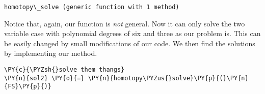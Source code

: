 \documentclass[11pt]{article}
\begin{document}
            \begin{tcolorbox}[breakable, size=fbox, boxrule=.5pt, pad at break*=1mm, opacityfill=0]
\begin{Verbatim}[commandchars=\\\{\}]
homotopy\_solve (generic function with 1 method)
\end{Verbatim}
\end{tcolorbox}
        
    Notice that, again, our function is \emph{not} general. Now it can only
solve the two variable case with polynomial degrees of six and three as
our problem is. This can be easily changed by small modifications of our
code. We then find the solutions by implementing our method.

    \begin{tcolorbox}[breakable, size=fbox, boxrule=1pt, pad at break*=1mm,colback=cellbackground, colframe=cellborder]
\begin{Verbatim}[commandchars=\\\{\}]
\PY{c}{\PYZsh{}solve them thangs}
\PY{n}{sol2} \PY{o}{=} \PY{n}{homotopy\PYZus{}solve}\PY{p}{(}\PY{n}{FS}\PY{p}{)}
\end{Verbatim}
\end{tcolorbox}
\end{document}
